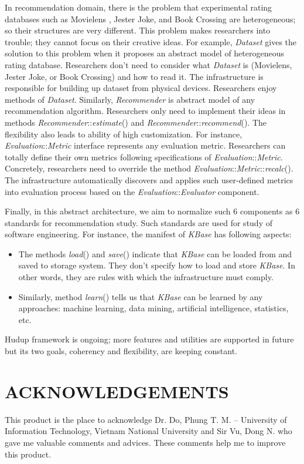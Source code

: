 \documentclass[a4paper,twoside]{article}
\begin{document}
In recommendation domain, there is the problem that experimental rating databases such as Movielens \cite{movielens}, Jester Joke, and Book Crossing are heterogeneous; so their structures are very different. This problem makes researchers into trouble; they cannot focus on their creative ideas. For example, \textit{Dataset} gives the solution to this problem when it proposes an abstract model of heterogeneous rating database. Researchers don't need to consider what \textit{Dataset} is (Movielens, Jester Joke, or Book Crossing) and how to read it. The infrastructure is responsible for building up dataset from physical devices. Researchers enjoy methods of \textit{Dataset}. Similarly, \textit{Recommender} is abstract model of any recommendation algorithm. Researchers only need to implement their ideas in methods \textit{Recommender}::\textit{estimate}() and \textit{Recommender}::\textit{recommend}(). The flexibility also leads to ability of high customization. For instance, \textit{Evaluation}::\textit{Metric} interface represents any evaluation metric. Researchers can totally define their own metrics following specifications of \textit{Evaluation}::\textit{Metric}. Concretely, researchers need to override the method \textit{Evaluation}::\textit{Metric}::\textit{recalc}(). The infrastructure automatically discovers and applies such user-defined metrics into evaluation process based on the \textit{Evaluation}::\textit{Evaluator} component.

Finally, in this abstract architecture, we aim to normalize such 6 components as 6 standards for recommendation study. Such standards are used for study of software engineering. For instance, the manifest of \textit{KBase} has following aspects:
\begin{itemize}
\item The methods \textit{load}() and \textit{save}() indicate that \textit{KBase} can be loaded from and saved to storage system. They don't specify how to load and store \textit{KBase}. In other words, they are rules with which the infrastructure must comply.
\item Similarly, method \textit{learn}() tells us that \textit{KBase} can be learned by any approaches: machine learning, data mining, artificial intelligence, statistics, etc.
\end{itemize}
Hudup framework is ongoing; more features and utilities are supported in future but its two goals, coherency and flexibility, are keeping constant.

\section*{\uppercase{Acknowledgements}}
\noindent This product is the place to acknowledge Dr. Do, Phung T. M. – University of Information Technology, Vietnam National University and Sir Vu, Dong N. who gave me valuable comments and advices. These comments help me to improve this product.


{\small
}

\vfill
\end{document}
